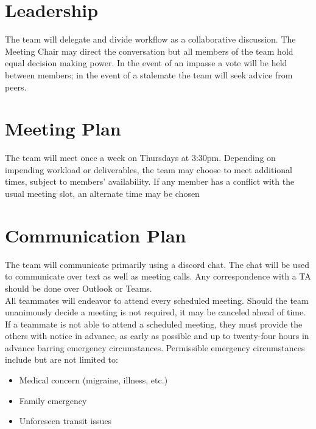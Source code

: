 \documentclass{article}
\begin{document}
\section{Leadership}

The team will delegate and divide workflow as a collaborative discussion. The Meeting Chair may direct the conversation but all members of the team hold equal decision making power. In the event of an impasse a vote will be held between members; in the event of a stalemate the team will seek advice from peers. \\

\section{Meeting Plan}

The team will meet once a week on Thursdays at 3:30pm. Depending on impending workload or deliverables, the team may choose to meet additional times, subject to members' availability. If any member has a conflict with the usual meeting slot, an alternate time may be chosen

\section{Communication Plan}

The team will communicate primarily using a discord chat. The chat will be used to communicate over text as well as meeting calls. Any correspondence with a TA should be done over Outlook or Teams. \\

All teammates will endeavor to attend every scheduled meeting. Should the team unanimously decide a meeting is not required, it may be canceled ahead of time. If a teammate is not able to attend a scheduled meeting, they must provide the others with notice in advance, as early as possible and up to twenty-four hours in advance barring emergency circumstances. Permissible emergency circumstances include but are not limited to: \\

\begin{itemize}
    \item Medical concern (migraine, illness, etc.)
    \item Family emergency
    \item Unforeseen transit issues \\
\end{itemize}
\end{document}
